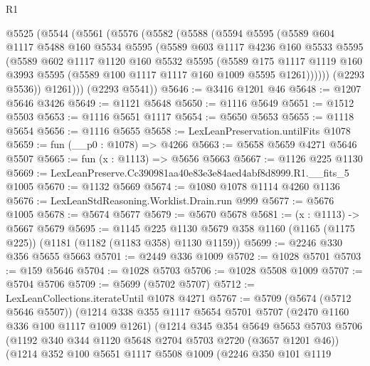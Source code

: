 \begin{lexlean}{R1}
\begin{coremodule}
  @5525
    (@5544
      (@5561
        (@5576
          (@5582
            (@5588
              (@5594
                @5595
                (@5589
                  @604
                  @1117
                  @5488
                  @160
                  @5534
                  @5595
                  (@5589
                    @603
                    @1117
                    @4236
                    @160
                    @5533
                    @5595
                    (@5589
                      @602
                      @1117
                      @1120
                      @160
                      @5532
                      @5595
                      (@5589
                        @175
                        @1117
                        @1119
                        @160
                        @3993
                        @5595
                        (@5589 @100 @1117 @1117 @160 @1009 @5595 @1261))))))
              (@2293 @5536))
            @1261)))
      (@2293 @5541))
@5646 := @3416 @1201 @46
@5648 := @1207 @5646 @3426
@5649 := @1121 @5648
@5650 := @1116 @5649
@5651 := @1512 @5503
@5653 := @1116 @5651 @1117
@5654 := @5650 @5653
@5655 := @1118 @5654
@5656 := @1116 @5655
@5658 := LexLeanPreservation.untilFits @1078
@5659 := fun (__p0 : @1078) => @4266
@5663 := @5658 @5659 @4271 @5646 @5507
@5665 := fun (x : @1113) => @5656 @5663
@5667 := @1126 @225 @1130
@5669 := LexLeanPreserve.Cc390981aa40e83e3e84aed4abf8d8999.R1.__fits_5 @1005
@5670 := @1132 @5669
@5674 := @1080 @1078 @1114 @4260 @1136
@5676 := LexLeanStdReasoning.Worklist.Drain.run @999
@5677 := @5676 @1005
@5678 := @5674 @5677
@5679 := @5670 @5678
@5681 := (x : @1113) -> @5667 @5679
@5695 := @1145
    @225
    @1130
    @5679
    @358
    @1160
    (@1165 (@1175 @225))
    (@1181 (@1182 (@1183 @358) @1130 @1159))
@5699 := @2246 @330 @356 @5655 @5663
@5701 := @2449 @336 @1009
@5702 := @1028 @5701
@5703 := @159 @5646
@5704 := @1028 @5703
@5706 := @1028 @5508 @1009
@5707 := @5704 @5706
@5709 := @5699 (@5702 @5707)
@5712 := LexLeanCollections.iterateUntil @1078 @4271
@5767 := @5709
    (@5674 (@5712 @5646 @5507))
    (@1214
      @338
      @355
      @1117
      @5654
      @5701
      @5707
      (@2470 @1160 @336 @100 @1117 @1009 @1261)
      (@1214
        @345
        @354
        @5649
        @5653
        @5703
        @5706
        (@1192 @340 @344 @1120 @5648 @2704 @5703 @2720 (@3657 @1201 @46))
        (@1214
          @352
          @100
          @5651
          @1117
          @5508
          @1009
          (@2246
            @350
            @101
            @1119

\end{coremodule}
\end{lexlean}

